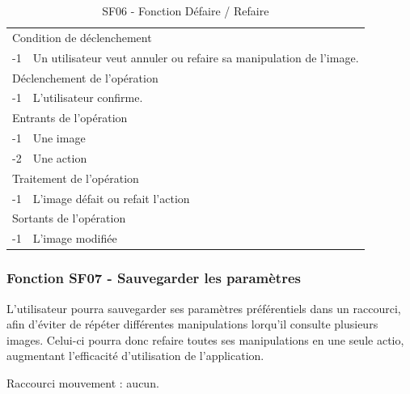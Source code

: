 \documentclass[a4paper]{article}
\begin{document}
\begin{table}[H]
  \centering
   \small
	\begin{tabular}{|c|p{12cm}|}
   		\hline
   			\rowcolor{lightgray}\multicolumn{2}{|c|}{\textbf{SF06 - Fonction Défaire / Refaire}} \\
   		\hline
   			\multicolumn{2}{|l|}{Condition de d\'eclenchement} \\
   		\hline
   			-1 & Un utilisateur veut annuler ou refaire sa manipulation de l'image. \\
   		\hline
   			\multicolumn{2}{|l|}{D\'eclenchement de l'op\'eration} \\
   		\hline
   			-1 & L'utilisateur confirme. \\
   		\hline
   			\multicolumn{2}{|l|}{Entrants de l'op\'eration} \\
   		\hline
        	-1 & Une image \\
   			-2 & Une action \\ 	
        \hline
   			\multicolumn{2}{|l|}{Traitement de l'op\'eration} \\
  		\hline
   			-1 & L'image défait ou refait l'action \\
   		\hline
   			\multicolumn{2}{|l|}{Sortants de l'op\'eration} \\
   		\hline
   			-1 & L'image modifiée \\
   		\hline
	\end{tabular}
  \caption{SF06 - Fonction Défaire / Refaire}
  \normalsize
  \label{tab:visu_img_undo_redo}
\end{table}



\subsubsection{Fonction SF07 - Sauvegarder les paramètres}

L'utilisateur pourra sauvegarder ses paramètres préférentiels dans un raccourci, afin d'éviter de répéter différentes manipulations lorqu'il consulte plusieurs images. Celui-ci pourra donc refaire toutes ses manipulations en une seule actio, augmentant l'efficacité d'utilisation de l'application.

Raccourci mouvement : aucun.
\end{document}
